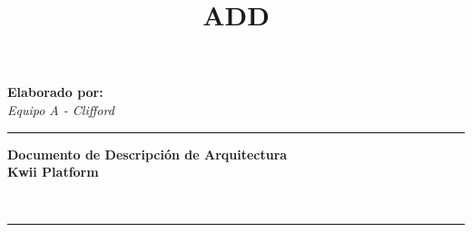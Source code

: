 \documentclass[letterpaper]{article}
\begin{document}
    \title{ADD}
    \fancyhead{}
    \fancyfoot{}
    \fancyfoot[R]{\large \textbf{\thepage}}

    \begin{minipage}{0.20\textwidth}
        \begin{flushleft}
            \textbf{Elaborado por:}\\
            \textit{Equipo A - Clifford \\}
        \end{flushleft}
    \end{minipage}
    \begin{minipage}{0.7cm}
        \textcolor{kwii_color}{\rule{0.3cm}{2.5cm}}
    \end{minipage}
    \begin{minipage}{0.74\textwidth}
        \Large{\textbf{Documento de Descripción de Arquitectura}}\\
        \LARGE{\textbf{Kwii Platform}}
    \end{minipage}

\noindent
\\
\textcolor{kwii_color}{\rule{\textwidth}{0.5pt}}\\

\end{document}
